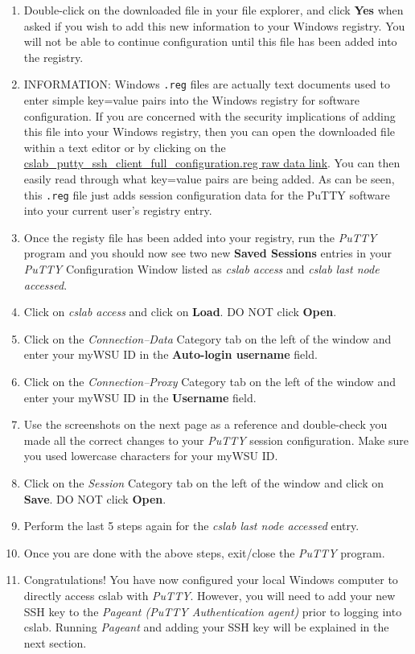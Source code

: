 \documentclass[12pt]{article}
\begin{document}
\begin{flushleft}
\begin{enumerate}
  \item Double-click on the downloaded file in your file explorer, and click \textbf{Yes} when asked if you wish to add this new information to your Windows registry. You will not be able to continue configuration until this file has been added into the registry.
  \item INFORMATION: Windows \texttt{.reg} files are actually text documents used to enter simple key=value pairs into the Windows registry for software configuration. If you are concerned with the security implications of adding this file into your Windows registry, then you can open the downloaded file within a text editor or by clicking on the \href{https://raw.githubusercontent.com/benroose/tutorials/master/cslab_tutorials/cslab_ssh_client_config_files/cslab_putty_ssh_client_full_configuration.reg}{cslab\_putty\_ssh\_client\_full\_configuration.reg raw data link}. You can then easily read through what key=value pairs are being added. As can be seen, this \texttt{.reg} file just adds session configuration data for the PuTTY software into your current user's registry entry.
  \item Once the registy file has been added into your registry, run the \textit{PuTTY} program and you should now see two new \textbf{Saved Sessions} entries in your \textit{PuTTY} Configuration Window listed as \textit{cslab access} and \textit{cslab last node accessed}.
  \item Click on \textit{cslab access} and click on \textbf{Load}. DO NOT click \textbf{Open}.
  \item Click on the \textit{Connection--Data} Category tab on the left of the window and enter your myWSU ID in the \textbf{Auto-login username} field.
  \item Click on the \textit{Connection--Proxy} Category tab on the left of the window and enter your myWSU ID in the \textbf{Username} field.
  \item Use the screenshots on the next page as a reference and double-check you made all the correct changes to your \textit{PuTTY} session configuration. Make sure you used lowercase characters for your myWSU ID.
  \item Click on the \textit{Session} Category tab on the left of the window and click on \textbf{Save}. DO NOT click \textbf{Open}.
  \item Perform the last 5 steps again for the \textit{cslab last node accessed} entry.
  \item Once you are done with the above steps, exit/close the \textit{PuTTY} program.
  \item Congratulations! You have now configured your local Windows computer to directly access cslab with \textit{PuTTY}. However, you will need to add your new SSH key to the \textit{Pageant (PuTTY Authentication agent)} prior to logging into cslab. Running \textit{Pageant} and adding your SSH key will be explained in the next section.
\end{enumerate}


\end{flushleft}
\end{document}
